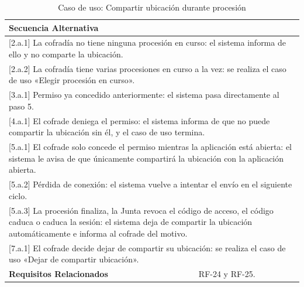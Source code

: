 \begin{table}[h!]
\begin{tabular}{|p{4cm}|p{11cm}|}
        \hline
        \multicolumn{2}{|l|}{\textbf{Secuencia Alternativa}} \\
        \hline
        \multicolumn{2}{|p{15cm}|}{ [2.a.1] La cofradía no tiene ninguna procesión en curso: el sistema informa de ello y no comparte la ubicación. } \\
        \hline
        \multicolumn{2}{|p{15cm}|}{ [2.a.2] La cofradía tiene varias procesiones en curso a la vez: se realiza el caso de uso «Elegir procesión en curso». } \\
        \hline
        \multicolumn{2}{|p{15cm}|}{ [3.a.1] Permiso ya concedido anteriormente: el sistema pasa directamente al paso 5. } \\
        \hline
        \multicolumn{2}{|p{15cm}|}{ [4.a.1] El cofrade deniega el permiso: el sistema informa de que no puede compartir la ubicación sin él, y el caso de uso termina. } \\
        \hline
        \multicolumn{2}{|p{15cm}|}{ [5.a.1] El cofrade solo concede el permiso mientras la aplicación está abierta: el sistema le avisa de que únicamente compartirá la ubicación con la aplicación abierta. } \\
        \hline
        \multicolumn{2}{|p{15cm}|}{ [5.a.2] Pérdida de conexión: el sistema vuelve a intentar el envío en el siguiente ciclo. } \\
        \hline
        \multicolumn{2}{|p{15cm}|}{ [5.a.3] La procesión finaliza, la Junta revoca el código de acceso, el código caduca o caduca la sesión: el sistema deja de compartir la ubicación automáticamente e informa al cofrade del motivo. } \\
        \hline
        \multicolumn{2}{|p{15cm}|}{ [7.a.1] El cofrade decide dejar de compartir su ubicación: se realiza el caso de uso «Dejar de compartir ubicación». } \\
        \hline
        \textbf{Requisitos Relacionados} & RF-24 y RF-25. \\
        \hline
    \end{tabular}
    \caption{Caso de uso: Compartir ubicación durante procesión}
\end{table}

